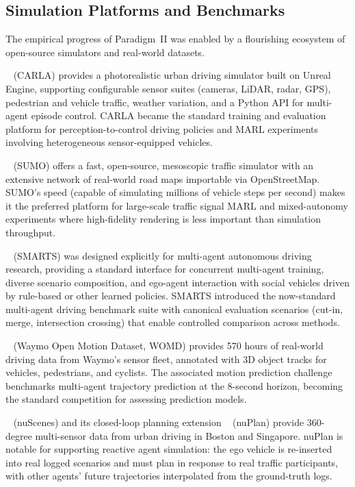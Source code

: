 \documentclass[12pt, a4paper]{article}
\begin{document}
\subsection{Simulation Platforms and Benchmarks}
\label{sec:sim}

The empirical progress of Paradigm~II was enabled by a flourishing ecosystem
of open-source simulators and real-world datasets.

\citeauthor{dosovitskiy2017carlaopenurbandriving}~\cite{dosovitskiy2017carlaopenurbandriving}
(CARLA) provides a photorealistic urban driving simulator built on Unreal
Engine, supporting configurable sensor suites (cameras, LiDAR, radar, GPS),
pedestrian and vehicle traffic, weather variation, and a Python API for
multi-agent episode control.  CARLA became the standard training and evaluation
platform for perception-to-control driving policies and MARL experiments
involving heterogeneous sensor-equipped vehicles.

\citeauthor{krajzewicz2012recent}~\cite{krajzewicz2012recent} (SUMO) offers a
fast, open-source, mesoscopic traffic simulator with an extensive network of
real-world road maps importable via OpenStreetMap.  SUMO's speed (capable of
simulating millions of vehicle steps per second) makes it the preferred
platform for large-scale traffic signal MARL and mixed-autonomy experiments
where high-fidelity rendering is less important than simulation throughput.

\citeauthor{zhou2020smarts}~\cite{zhou2020smarts} (SMARTS) was designed
explicitly for multi-agent autonomous driving research, providing a standard
interface for concurrent multi-agent training, diverse scenario composition, and
ego-agent interaction with social vehicles driven by rule-based or other learned
policies.  SMARTS introduced the now-standard multi-agent driving benchmark
suite with canonical evaluation scenarios (cut-in, merge, intersection crossing)
that enable controlled comparison across methods.

\citeauthor{ettinger2021large}~\cite{ettinger2021large} (Waymo Open Motion
Dataset, WOMD) provides 570 hours of real-world driving data from Waymo's
sensor fleet, annotated with 3D object tracks for vehicles, pedestrians, and
cyclists.  The associated motion prediction challenge benchmarks multi-agent
trajectory prediction at the 8-second horizon, becoming the standard competition
for assessing prediction models.

\citeauthor{caesar2020nuscenes}~\cite{caesar2020nuscenes} (nuScenes) and its
closed-loop planning extension \citeauthor{caesar2021nuplan}~\cite{caesar2021nuplan}
(nuPlan) provide 360-degree multi-sensor data from urban driving in Boston and
Singapore.  nuPlan is notable for supporting reactive agent simulation: the
ego vehicle is re-inserted into real logged scenarios and must plan in response
to real traffic participants, with other agents' future trajectories interpolated
from the ground-truth logs.
\end{document}
